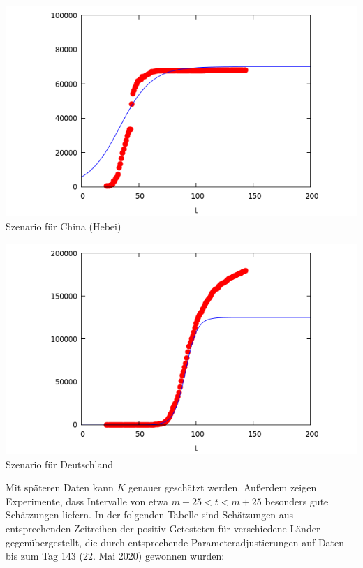 \documentclass[a4paper,11pt]{article}
\begin{document}
\begin{center}
  \begin{minipage}{.48\textwidth}\centering
    \includegraphics[width=\textwidth]{China-1.png}\\[1em]
                    {Szenario für China (Hebei)}
  \end{minipage}\hfill
  \begin{minipage}{.48\textwidth}\centering
    \includegraphics[width=\textwidth]{Germany-1.png}\\[1em]
                    {Szenario für Deutschland}
  \end{minipage}
\end{center}
Mit späteren Daten kann $K$ genauer geschätzt werden. Außerdem zeigen
Experimente, dass Intervalle von etwa $m-25<t<m+25$ besonders gute Schätzungen
liefern. In der folgenden Tabelle sind Schätzungen aus entsprechenden
Zeitreihen der positiv Getesteten für verschiedene Länder gegenübergestellt,
die durch entsprechende Parameteradjustierungen auf Daten bis zum Tag 143
(22. Mai 2020) gewonnen wurden:
\end{document}
